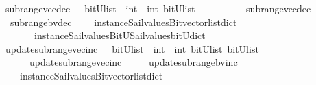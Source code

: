 \begin{isabellebody}
\isanewline
%
\isanewline
{}\isamarkupfalse%
\ subrange{\isacharunderscore}vec{\isacharunderscore}dec\ \ {\isacharcolon}{\isacharcolon}\ {\isachardoublequoteopen}{\isacharparenleft}bitU{\isacharparenright}list\ {\isasymRightarrow}\ int\ {\isasymRightarrow}\ int\ {\isasymRightarrow}{\isacharparenleft}bitU{\isacharparenright}list\ {\isachardoublequoteclose}\ \ \ \isanewline
\ \ \ \ \ {\isachardoublequoteopen}\ subrange{\isacharunderscore}vec{\isacharunderscore}dec\ {\isacharequal}\ {\isacharparenleft}\ \isanewline
\ \ subrange{\isacharunderscore}bv{\isacharunderscore}dec\isanewline
\ \ \ \ {\isacharparenleft}instance{\isacharunderscore}Sail{}{\isacharunderscore}values{\isacharunderscore}Bitvector{\isacharunderscore}list{\isacharunderscore}dict\isanewline
\ \ \ \ \ \ \ instance{\isacharunderscore}Sail{}{\isacharunderscore}values{\isacharunderscore}BitU{\isacharunderscore}Sail{}{\isacharunderscore}values{\isacharunderscore}bitU{\isacharunderscore}dict{\isacharparenright}\ {\isacharparenright}{\isachardoublequoteclose}\isanewline
\isanewline
\isanewline
%
\isanewline
{}\isamarkupfalse%
\ update{\isacharunderscore}subrange{\isacharunderscore}vec{\isacharunderscore}inc\ \ {\isacharcolon}{\isacharcolon}\ {\isachardoublequoteopen}{\isacharparenleft}bitU{\isacharparenright}list\ {\isasymRightarrow}\ int\ {\isasymRightarrow}\ int\ {\isasymRightarrow}{\isacharparenleft}bitU{\isacharparenright}list\ {\isasymRightarrow}{\isacharparenleft}bitU{\isacharparenright}list\ {\isachardoublequoteclose}\ \ \ \isanewline
\ \ \ \ \ {\isachardoublequoteopen}\ update{\isacharunderscore}subrange{\isacharunderscore}vec{\isacharunderscore}inc\ {\isacharequal}\ {\isacharparenleft}\ \isanewline
\ \ update{\isacharunderscore}subrange{\isacharunderscore}bv{\isacharunderscore}inc\isanewline
\ \ \ \ {\isacharparenleft}instance{\isacharunderscore}Sail{}{\isacharunderscore}values{\isacharunderscore}Bitvector{\isacharunderscore}list{\isacharunderscore}dict\isanewline

\end{isabellebody}
